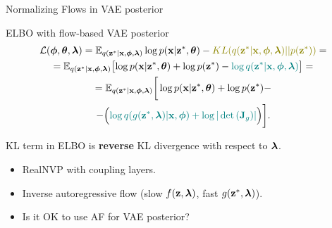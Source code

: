 \documentclass{beamer}
\begin{document}
\begin{frame}{Normalizing Flows in VAE posterior}
	\vspace{-0.2cm}
	\begin{block}{ELBO with flow-based VAE posterior}
		\vspace{-0.8cm}
		\begin{multline*}
			\mathcal{L} (\bphi, \btheta, \blambda) =  \bbE_{q(\bz^* | \bx, \bphi, \blambda)} \log p(\bx | \bz^*, \btheta) - {\color{olive}KL (q(\bz^* | \bx, \bphi, \blambda) || p(\bz^*))} = \\ = \bbE_{q(\bz^* | \bx, \bphi, \blambda)} \bigl[\log p(\bx | \bz^*, \btheta) + \log p(\bz^*) - {\color{teal}\log q(\bz^*| \bx, \bphi, \blambda)} \bigr] = \\
			= \bbE_{q(\bz^* | \bx, \bphi, \blambda)} \bigg[\log p(\bx| \bz^*, \btheta)  + \log p(\bz^*) - \\ - \Bigl({\color{teal}\log q(g(\bz^*, \blambda) | \bx, \bphi ) + \log | \det \left( \bJ_g ) \right| }\Bigr)  \bigg].
		\end{multline*}
	\end{block}
	\vspace{-0.7cm}
	{\color{olive}KL term} in ELBO is \textbf{reverse} KL divergence with respect to $\boldsymbol{\lambda}$.
	\begin{itemize}
		\item RealNVP with coupling layers.
		\item Inverse autoregressive flow (slow $f(\mathbf{z}, \boldsymbol{\lambda})$, fast $g(\mathbf{z}^*, \boldsymbol{\lambda})$).
		\item {\color{gray}Is it OK to use AF for VAE posterior?}
	\end{itemize}
\end{frame}
\end{document}

